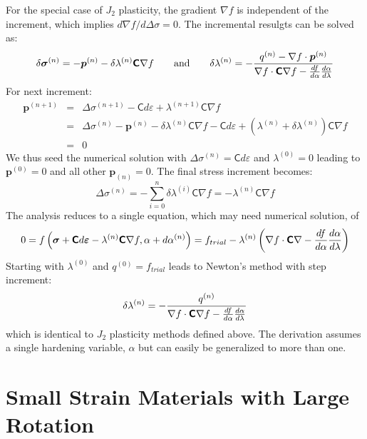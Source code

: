 \documentclass[11pt]{book}
\renewcommand{\vec}[1]{\boldsymbol{#1}}
\newcommand{\tens}[1]{\boldsymbol{\mathsf{#1}}}
\begin{document}
For the special case of $J_2$ plasticity, the gradient $\nabla f$ is independent of the increment, which implies ${d\nabla f / d\Delta\tens\sigma} =0$. The incremental resulgts can be solved as:
\begin{equation}
      \delta\tens\sigma^{(n)} = -\vec p^{(n)} - \delta\lambda^{(n)}\tens C\nabla f
      \qquad {\rm and} \qquad
      \delta\lambda^{(n)} = -{q^{(n)} - \nabla f\cdot\vec p^{(n)} \over \nabla f\cdot\tens C\nabla f - {df\over d\alpha} {d\alpha\over d\lambda}}
\end{equation}
For next increment:
\begin{eqnarray}
       \vec p^{(n+1)} & = &  \Delta \tens\sigma^{(n+1)} - \tens C d\tens\varepsilon + \lambda^{(n+1)} \tens C \nabla f \\
          & = & \Delta \tens\sigma^{(n)} -\vec p^{(n)} - \delta\lambda^{(n)}\tens C\nabla f - \tens C d\tens\varepsilon + (\lambda^{(n)}+\delta\lambda^{(n)}) \tens C \nabla f \\
          & = & 0
\end{eqnarray}
We thus seed the numerical solution with $\Delta \tens\sigma^{(n)}=\tens C d\tens\varepsilon$ and $\lambda^{(0)}=0$ leading to $\vec p^{(0)}=0$ and all other $\vec p_{(n)}=0$. The final stress increment becomes:
\begin{equation}
      \Delta\tens\sigma^{(n)} = -\sum_{i=0}^{n} \delta\lambda^{(i)}\tens C\nabla f = -\lambda^{(n)} \tens C\nabla f
\end{equation}
The analysis reduces to a single equation, which may need numerical solution, of
\begin{equation}
            0 =  f\left(\tens\sigma +\tens C d\tens\varepsilon -  \lambda^{(n)} \tens C\nabla f,\alpha +d\alpha^{(n)}\right)
            = f_{trial} - \lambda^{(n)}\left(\nabla f\cdot \tens C\nabla - {df\over d\alpha} {d\alpha\over d\lambda}\right)
\end{equation}
Starting with $\lambda^{(0)}$ and $q^{(0)}=f_{trial}$ leads to Newton's method with step increment:
\begin{equation}
       \delta\lambda^{(n)} = -{q^{(n)}  \over \nabla f\cdot\tens C\nabla f - {df\over d\alpha} {d\alpha\over d\lambda}}
\end{equation}
which is identical to $J_2$ plasticity methods defined above. The derivation assumes a single hardening variable, $\alpha$ but can easily be generalized to more than one.


\chapter{Small Strain Materials with Large Rotation}
\end{document}
